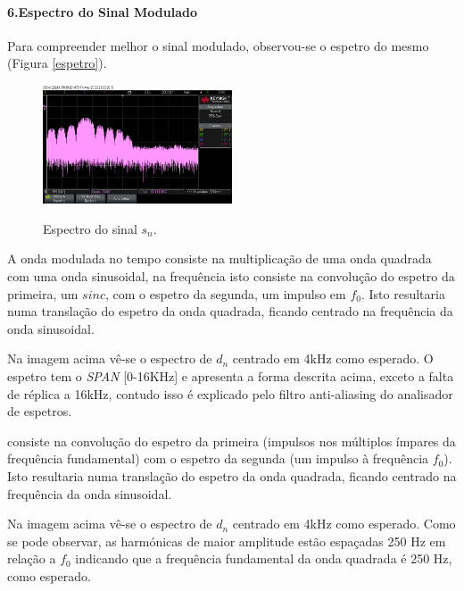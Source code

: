 \documentclass[11pt]{article}
\numberwithin{equation}{section}
\begin{document}
\paragraph{6.Espectro do Sinal Modulado} \hspace{0pt}
\label{para:P2-6}

Para compreender melhor o sinal modulado, observou-se o espetro do mesmo (Figura \ref{espetro}).
\begin{figure}[H]
	\centering
	\includegraphics[width=0.5\textwidth]{./spectrum_sn_0-16k}~\\
	\caption{Espectro do sinal $s_n$.}
	\label{espetrosn}
\end{figure}

A onda modulada no tempo consiste na multiplicação de uma onda quadrada com uma onda sinusoidal, na frequência isto consiste na convolução do espetro da primeira, um $sinc$, com o espetro da segunda, um impulso em $f_0$. Isto resultaria numa translação do espetro da onda quadrada, ficando centrado na frequência da onda sinusoidal.

Na imagem acima vê-se o espectro de $d_n$ centrado em 4kHz como esperado. O espetro tem o \textit{SPAN} [0-16KHz] e apresenta a forma descrita acima, exceto a falta de réplica a 16kHz, contudo isso é explicado pelo filtro anti-aliasing do analisador de espetros.

consiste na convolução do espetro da primeira (impulsos nos múltiplos ímpares da frequência fundamental) com o espetro da segunda (um impulso à frequência $f_0$). Isto resultaria numa translação do espetro da onda quadrada, ficando centrado na frequência da onda sinusoidal.

Na imagem acima vê-se o espectro de $d_n$ centrado em 4kHz como esperado. Como se pode observar, as harmónicas de maior amplitude estão espaçadas 250 Hz em relação a $f_0$ indicando que a frequência fundamental da onda quadrada é 250 Hz, como esperado.
\end{document}
